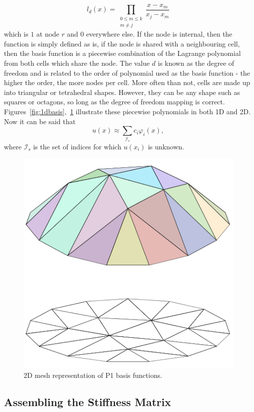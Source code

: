 \begin{equation}
	l_d(x) = \prod_{\substack{0\leq m\leq k \\ m\neq j}}\frac{x-x_m}{x_j-x_m} 
\end{equation}
which is $1$ at node $r$ and $0$ everywhere else. If the node is internal, then the function is simply defined as is, if the node is shared with a neighbouring cell, then the basis function is a piecewise combination of the Lagrange polynomial from both cells which share the node. The value $d$ is known as the degree of freedom and is related to the order of polynomial used as the basis function - the higher the order, the more nodes per cell. More often than not, cells are made up into triangular or tetrahedral shapes. However, they can be any shape such as squares or octagons, so long as the degree of freedom mapping is correct. Figures~\ref{fig:1dbasis},~\ref{fig:2dbasis} illustrate these piecewise polynomials in both 1D and 2D. Now it can be said that
\begin{equation}\label{femapprox}
	u(x) \approx \sum_{\mathcal{I}_s} c_i \varphi_i(x),
\end{equation}
where $\mathcal{I}_s$ is the set of indices for which $u(x_i)$ is unknown.

\begin{figure}
	\centering
	\includegraphics[width=0.4\linewidth]{Figures/Piecewise_linear_function2D}
	\caption{2D mesh representation of P1 basis functions.}
	\label{fig:2dbasis}
\end{figure}

\subsection{Assembling the Stiffness Matrix}

